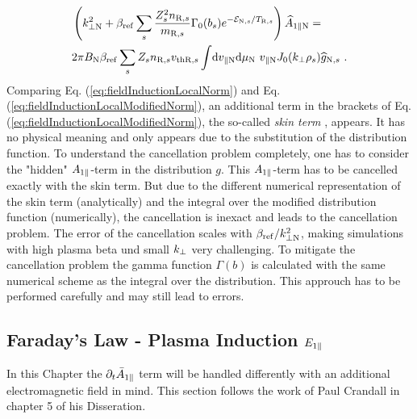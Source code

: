 \begin{gather}
    \begin{aligned}
        &\left(k_{\perp \mathrm{N}}^2 + \beta_\mathrm{ref} \sum_s \frac{Z^2_sn_{\mathrm{R},s}}{m_{\mathrm{R},s}} \Gamma_0(b_s) e^{-\mathcal{E}_{\mathrm{N},s}/T_{\mathrm{R},s}} \right) \widehat{A}_{1\parallel \mathrm{N}} = \\
        & 2\pi B_\mathrm{N} \beta_\mathrm{ref} \sum_s Z_s n_{\mathrm{R},s} v_{\mathrm{th}\mathrm{R},s} \int \! \mathrm{d}v_{\parallel \mathrm{N}} \mathrm{d}\mu_\mathrm{N} ~ v_{\parallel \mathrm{N}} J_0(k_\perp \rho_s) \widehat{g}_{\mathrm{N},s} ~.
    \end{aligned}
    \label{eq:fieldInductionLocalModifiedNorm}
\end{gather}
Comparing Eq. (\ref{eq:fieldInductionLocalNorm}) and Eq. (\ref{eq:fieldInductionLocalModifiedNorm}), an additional term in the brackets of Eq. (\ref{eq:fieldInductionLocalModifiedNorm}), the so-called \textit{skin term} \cite{Mishchenko2017}, appears. It has no physical meaning and only appears due to the substitution of the distribution function. To understand the cancellation problem completely, one has to consider the "hidden" $A_{1\parallel}$-term in the distribution $g$. This $A_{1\parallel}$-term has to be cancelled exactly with the skin term. But due to the different numerical representation of the skin term (analytically) and the integral over the modified distribution function (numerically), the cancellation is inexact and leads to the cancellation problem. The error of the cancellation scales with $\beta_\mathrm{ref}/k_{\perp \mathrm{N}}^2$, making simulations with high plasma beta und small $k_\perp$ very challenging. \cite{Naitou1995} To mitigate the cancellation problem the gamma function $\Gamma(b)$ is calculated with the same numerical scheme as the integral over the distribution. This approuch has to be performed carefully and may still lead to errors.
\newpage

\subsection{Faraday's Law - Plasma Induction $E_{1\parallel}$}
\label{sub:fieldEpar}

In this Chapter the $\partial_t \bar{A}_{1\parallel}$ term will be handled differently with an additional electromagnetic field in mind. This section follows the work of Paul Crandall in chapter 5 of his Disseration\cite{Crandall_PHD}.
\bigskip

